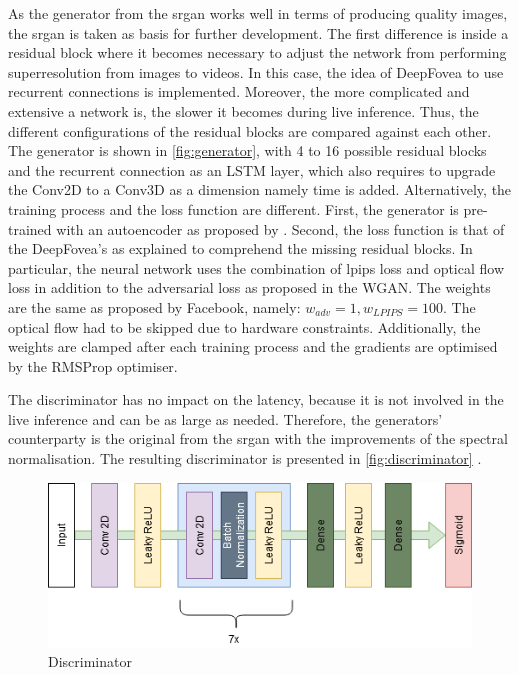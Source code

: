 \par
As the generator from the \gls{srgan} works well in terms of producing quality images, the \gls{srgan} is taken as basis for further development. The first difference is inside a residual block where it becomes necessary to adjust the network from performing superresolution from images to videos. In this case, the idea of DeepFovea to use recurrent connections is implemented. Moreover, the more complicated and extensive a network is, the slower it becomes during live inference. Thus, the different configurations of the residual blocks are compared against each other. The generator is shown in \autoref{fig:generator}, with 4 to 16 possible residual blocks and the recurrent connection as an LSTM layer, which also requires to upgrade the Conv2D to a Conv3D as a dimension namely time is added. Alternatively, the training process and the loss function are different. First, the generator is pre-trained with an autoencoder as proposed by \cite{ham2020}. Second, the loss function is that of the DeepFovea’s as explained to comprehend the missing residual blocks. In particular, the neural network uses the combination of \gls{lpips} loss and optical flow loss in addition to the adversarial loss as proposed in the WGAN. The weights are the same as proposed by Facebook, namely: \(w_{adv}=1, w_{LPIPS}=100\). The optical flow had to be skipped due to hardware constraints. Additionally, the weights are clamped after each training process and the gradients are optimised by the RMSProp optimiser.
\par 
The discriminator has no impact on the latency, because it is not involved in the live inference and can be as large as needed. Therefore, the generators’ counterparty is the original from the \gls{srgan} with the improvements of the spectral normalisation. The resulting discriminator is presented in \autoref{fig:discriminator} \parencite{Ledig2017}.

\begin{figure}[htbp]
    \includegraphics[width=\textwidth,height=\textheight,keepaspectratio]{logos/Discriminator.png}
     \caption{Discriminator}
    \label{fig:discriminator}
\end{figure}

